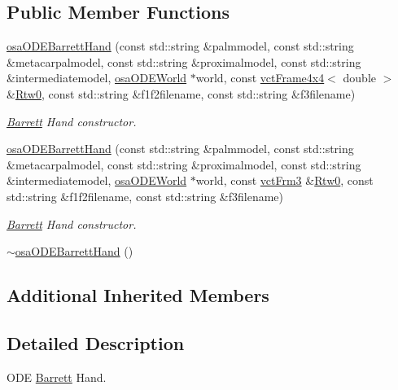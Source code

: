 \subsection*{Public Member Functions}
\begin{DoxyCompactItemize}
\item 
\hyperlink{classosa_o_d_e_barrett_hand_ae526bb3fca40d83bbc14b4f999186c47}{osa\-O\-D\-E\-Barrett\-Hand} (const std\-::string \&palmmodel, const std\-::string \&metacarpalmodel, const std\-::string \&proximalmodel, const std\-::string \&intermediatemodel, \hyperlink{classosa_o_d_e_world}{osa\-O\-D\-E\-World} $\ast$world, const \hyperlink{classvct_frame4x4}{vct\-Frame4x4}$<$ double $>$ \&\hyperlink{classrob_manipulator_ab48d9d9a166bf252698bc35788ca6ad6}{Rtw0}, const std\-::string \&f1f2filename, const std\-::string \&f3filename)
\begin{DoxyCompactList}\small\item\em \hyperlink{struct_barrett}{Barrett} Hand constructor. \end{DoxyCompactList}\item 
\hyperlink{classosa_o_d_e_barrett_hand_a79240e785e4b44d74f789513e1f90678}{osa\-O\-D\-E\-Barrett\-Hand} (const std\-::string \&palmmodel, const std\-::string \&metacarpalmodel, const std\-::string \&proximalmodel, const std\-::string \&intermediatemodel, \hyperlink{classosa_o_d_e_world}{osa\-O\-D\-E\-World} $\ast$world, const \hyperlink{vct_transformation_types_8h_a81feda0a02c2d1bc26e5553f409fed20}{vct\-Frm3} \&\hyperlink{classrob_manipulator_ab48d9d9a166bf252698bc35788ca6ad6}{Rtw0}, const std\-::string \&f1f2filename, const std\-::string \&f3filename)
\begin{DoxyCompactList}\small\item\em \hyperlink{struct_barrett}{Barrett} Hand constructor. \end{DoxyCompactList}\item 
\hyperlink{classosa_o_d_e_barrett_hand_acd1a9835c1ce44d9944927f6ca045714}{$\sim$osa\-O\-D\-E\-Barrett\-Hand} ()
\end{DoxyCompactItemize}
\subsection*{Additional Inherited Members}


\subsection{Detailed Description}
O\-D\-E \hyperlink{struct_barrett}{Barrett} Hand. 

